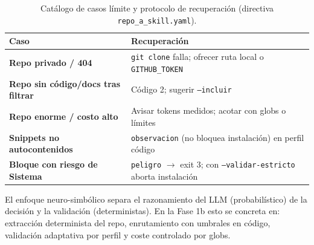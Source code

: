 \documentclass[11pt,a4paper]{article}
\begin{document}
\begin{table}[h!]
\centering
\small
\begin{tabularx}{\linewidth}{>{\bfseries\color{azulNoche}}l >{\raggedright\arraybackslash}X}
\toprule
\rowcolor{azulNoche!12}\textbf{Caso} & \textbf{Recuperación} \\
\midrule
Repo privado / 404 & \texttt{git clone} falla; ofrecer ruta local o \texttt{GITHUB\_TOKEN} \\
\midrule
Repo sin código/docs tras filtrar & Código 2; sugerir \texttt{--incluir} \\
\midrule
Repo enorme / costo alto & Avisar tokens medidos; acotar con globs o límites \\
\midrule
Snippets no autocontenidos & \texttt{observacion} (no bloquea instalación) en perfil código \\
\midrule
Bloque con riesgo de Sistema & \texttt{peligro} $\to$ exit 3; con \texttt{--validar-estricto} aborta instalación \\
\bottomrule
\end{tabularx}
\caption{Catálogo de casos límite y protocolo de recuperación (directiva \texttt{repo\_a\_skill.yaml}).}
\end{table}

\begin{cajaRecuerda}
El enfoque neuro-simbólico separa el razonamiento del LLM (probabilístico) de la decisión y la
validación (deterministas). En la Fase 1b esto se concreta en: extracción determinista del repo,
enrutamiento con umbrales en código, validación adaptativa por perfil y coste controlado por globs.
\end{cajaRecuerda}
\end{document}
